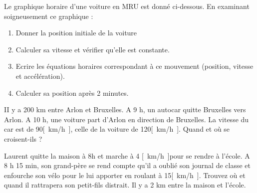 \newpage

\begin{exercise}
    Le graphique horaire d'une voiture en MRU est donné ci-dessous. En examinant soigneusement ce graphique :
    \begin{enumerate}[label=\alph*)]
        \item Donner la position initiale de la voiture
        \item Calculer sa vitesse et vérifier qu'elle est constante.
        \item Ecrire les équations horaires correspondant à ce mouvement (position, vitesse et accélération).
        \item Calculer sa position après 2 minutes.
    \end{enumerate}
\end{exercise}
\begin{solution}
\end{solution}

\begin{exercise}
    II y a 200 km entre Arlon et Bruxelles. A 9 h, un autocar quitte Bruxelles vers Arlon. A 10 h, une voiture  part d'Arlon en direction de Bruxelles. La vitesse du car est de 90\unit{[km/h]}, celle de la voiture de 120\unit{[km/h]}. Quand et où se croisent-ils ?
\end{exercise}
\begin{solution}
\end{solution}

\begin{exercise}
    Laurent quitte la maison à 8h et marche à 4 \unit{[km/h]}pour se rendre à l'école. A 8 h 15 min, son grand-père se rend compte qu'il a oublié son journal de classe et enfourche son vélo pour le lui apporter en roulant à 15\unit{[km/h]}. Trouvez où et quand il rattrapera son petit-fils distrait. Il y a 2 km entre la maison et l'école.
\end{exercise}
\begin{solution}
\end{solution}


